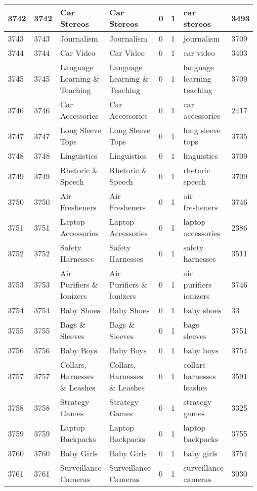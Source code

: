 \begin{longtable}{|l|l|l|l|l|l|l|l|}
3742 & 3742 & Car Stereos & Car Stereos & 0 & 1 & car stereos & 3493 \\ \hline 
3743 & 3743 & Journalism & Journalism & 0 & 1 & journalism & 3709 \\ \hline 
3744 & 3744 & Car Video & Car Video & 0 & 1 & car video & 3403 \\ \hline 
3745 & 3745 & Language Learning \& Teaching & Language Learning \& Teaching & 0 & 1 & language learning teaching & 3709 \\ \hline 
3746 & 3746 & Car Accessories & Car Accessories & 0 & 1 & car accessories & 2417 \\ \hline 
3747 & 3747 & Long Sleeve Tops & Long Sleeve Tops & 0 & 1 & long sleeve tops & 3735 \\ \hline 
3748 & 3748 & Linguistics & Linguistics & 0 & 1 & linguistics & 3709 \\ \hline 
3749 & 3749 & Rhetoric \& Speech & Rhetoric \& Speech & 0 & 1 & rhetoric speech & 3709 \\ \hline 
3750 & 3750 & Air Fresheners & Air Fresheners & 0 & 1 & air fresheners & 3746 \\ \hline 
3751 & 3751 & Laptop Accessories & Laptop Accessories & 0 & 1 & laptop accessories & 2386 \\ \hline 
3752 & 3752 & Safety Harnesses & Safety Harnesses & 0 & 1 & safety harnesses & 3511 \\ \hline 
3753 & 3753 & Air Purifiers \& Ionizers & Air Purifiers \& Ionizers & 0 & 1 & air purifiers ionizers & 3746 \\ \hline 
3754 & 3754 & Baby Shoes & Baby Shoes & 0 & 1 & baby shoes & 33 \\ \hline 
3755 & 3755 & Bags \& Sleeves & Bags \& Sleeves & 0 & 1 & bags sleeves & 3751 \\ \hline 
3756 & 3756 & Baby Boys & Baby Boys & 0 & 1 & baby boys & 3754 \\ \hline 
3757 & 3757 & Collars, Harnesses \& Leashes & Collars, Harnesses \& Leashes & 0 & 1 & collars harnesses leashes & 3591 \\ \hline 
3758 & 3758 & Strategy Games & Strategy Games & 0 & 1 & strategy games & 3325 \\ \hline 
3759 & 3759 & Laptop Backpacks & Laptop Backpacks & 0 & 1 & laptop backpacks & 3755 \\ \hline 
3760 & 3760 & Baby Girls & Baby Girls & 0 & 1 & baby girls & 3754 \\ \hline 
3761 & 3761 & Surveillance Cameras & Surveillance Cameras & 0 & 1 & surveillance cameras & 3030 \\ \hline 

\end{longtable}
